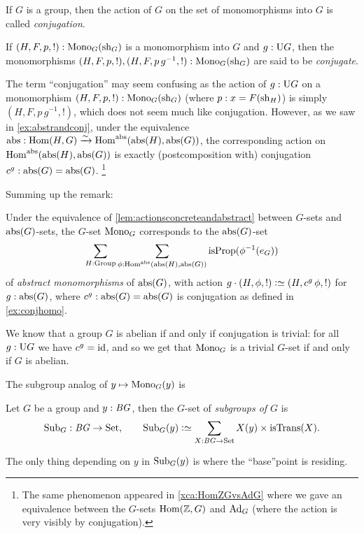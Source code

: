 \begin{definition}
  \label{def:conjactonmonos}
  If $G$ is a group, then the action of $G$ on the set of monomorphisms into $G$ is called \emph{conjugation}.

  \label{def:conjugate}
  If $(H,F,p,!):\mathrm{Mono}_G(\mathrm{sh}_G)$ is a monomorphism into $G$ and $g:\mathrm{U} G$, then the monomorphisms  $(H,F,p,!),(H,F,p\,g^{-1},!):\mathrm{Mono}_G(\mathrm{sh}_G)$ are said to be \emph{conjugate}.
\end{definition}
\begin{remark}
  \label{rem:whyconjugate}
  The term ``conjugation'' may seem confusing as the %
action of $g:\mathrm{U} G$ on a monomorphism $(H,F,p,!):\mathrm{Mono}_G(\mathrm{sh}_G)$ (where $p:x=F(\mathrm{sh}_H)$) is simply $(H,F,p\,g^{-1},!)$, which does not seem much like conjugation.
However, as we saw in \cref{ex:abstrandconj}, under the equivalence $\abstr:\Hom(H,G)\we\Hom^\abstr(\abstr(H),\abstr(G))$, the corresponding action on $\Hom^\abstr(\abstr(H),\abstr(G))$ is exactly (postcomposition with) conjugation $c^g:\mathrm{abs}(G)=\mathrm{abs}(G)$.
\footnote{The same phenomenon appeared in \cref{xca:HomZGvsAdG} where we gave an equivalence between the $G$-sets $\Hom(\ZZ,G)$ and $\Ad_G$ (where the action is very visibly by conjugation).}
  \label{rem:conjactiononmonos}
\end{remark}
Summing up the remark:
\begin{lemma}
  \label{lem:conjugationabstractly}
  Under the equivalence of \cref{lem:actionsconcreteandabstract} between $G$-sets and $\mathrm{abs}(G)$-sets, the $G$-set $\mathrm{Mono}_G$ corresponds to the $\mathrm{abs}(G)$-set
$$\sum_{H:\typegroup}\sum_{\phi:\Hom^\abstr(\abstr(H),\abstr(G))}\isprop(\phi^{-1}(e_G))$$ of \emph{abstract monomorphisms} of $\mathrm{abs}(G)$, with action $g\cdot(H,\phi,!)\defequi(H,c^g\,\phi,!)$ for $g:\mathrm{abs}(G)$, where  $c^g:\mathrm{abs}(G)=\mathrm{abs}(G)$ is conjugation as defined in \cref{ex:conjhomo}.
\end{lemma}
\begin{remark}
  \label{rem:typeofsubgpstrivifab}
  We know that a group $G$ is abelian if and only if conjugation is trivial: for all $g:\mathrm{U} G$ we have $c^g=\mathord{\mathrm{id}}$, and so we get that $\mathrm{Mono}_G$ is a trivial $G$-set if and only if $G$ is abelian.
\end{remark}

The subgroup analog of $y\mapsto\mathrm{Mono}_G(y)$ is

\begin{definition}
  Let $G$ be a group and $y:\mathit{B}\mathit{G}$, then the $G$-set of \emph{subgroups of $G$} is
  $$\typesubgroup_G:\BG\to\Set,\qquad\typesubgroup_G(y)\defequi\sum_{X:\BG\to\Set}
  X(y)\times\mathrm{isTrans}(X).$$
\end{definition}
The only thing depending on $y$ in $\mathrm{Sub}_G(y)$ is where the ``base''point is residing.


